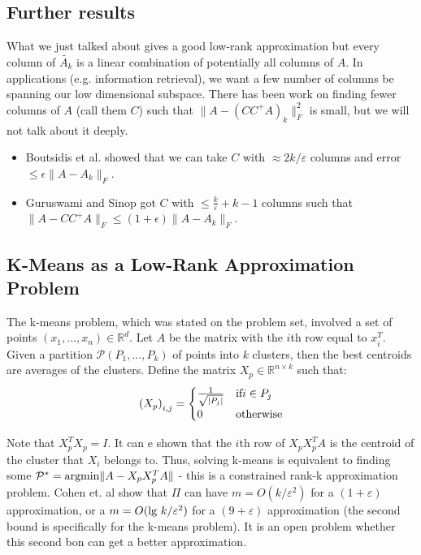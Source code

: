 \documentclass[11pt]{article}
\newcommand{\eps}{\varepsilon}
\newcommand{\R}{\mathbb{R}}
\begin{document}
\subsection{Further results}

What we just talked about gives a good low-rank approximation but every column of $\tilde{A_k}$ is a linear combination of potentially all columns of $A$. In applications (e.g. information retrieval), we want a few number of columns be spanning our low dimensional subspace. There has been work on finding fewer columns of $A$ (call them $C$) such that $\|A - (CC^+ A)_k\|_F^2$ is small, but we will not talk about it deeply.

\begin{itemize}
\item Boutsidis et al. \cite{BDM11} showed that we can take $C$ with $\approx 2k/\eps$ columns and error $\leq \epsilon\|A - A_k\|_F$. 

\item Guruswami and Sinop got $C$ with $\leq \frac{k}{\eps} + k - 1$ columns such that $\|A - CC^+ A\|_F \leq (1+\epsilon)\|A - A_k\|_F$. 
\end{itemize}

\subsection{K-Means as a Low-Rank Approximation Problem}
The k-means problem, which was stated on the problem set, involved a set of points $( x_1, ..., x_n) \in \R^d$. Let $A$ be the matrix with the $i$th row equal to $x_i^T$. Given a partition $\mathcal{P}(P_1, ..., P_k)$ of points into $k$ clusters, then the best centroids are averages of the clusters. Define the matrix $X_p \in \R^{n \times k}$ such that:
$$
\left(X_p\right)_{i, j} = \begin{cases} 
      \frac{1}{\sqrt{|P_j|}} & \textup{if} i \in P_j \\
      0 & \textup{otherwise}
   \end{cases}
$$

Note that $X_p^TX_p = I$. It can e shown that the $i$th row of $X_pX_p^T A$ is the centroid of the cluster that $X_i$ belongs to. Thus, solving k-means is equivalent to finding some $\mathcal{P}^* = \textup{argmin} \| A - X_pX_p^T A\|$ - this is a constrained rank-k approximation problem. Cohen et. al\cite{CEMMP15} show that $\Pi$ can have $m = O(k/\eps^2)$ for a $(1 + \eps)$ approximation, or a $m = O(\textup{lg }k / \eps^2)$ for a $(9 + \eps)$ approximation (the second bound is specifically for the k-means problem). It is an open problem whether this second bon can get a better approximation.
\end{document}
